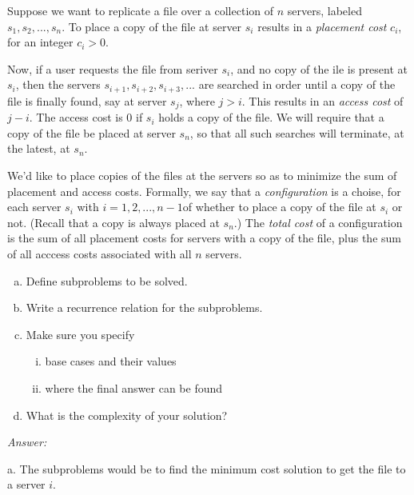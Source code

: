 \documentclass[12pt]{article}
\newenvironment{problem}[2][Problem]{\begin{trivlist}
\item[\hskip \labelsep {\bfseries #1}\hskip \labelsep {\bfseries #2.}]}{\end{trivlist}}
\begin{document}
\begin{problem}{2}
    Suppose we want to replicate a file over a collection of $n$ servers, labeled $s_1, s_2, ..., s_n$. To place a copy of the file at server $s_i$ results in a \textit{placement cost} $c_i$, for an integer $c_i>0$.
    
    Now, if a user requests the file from seriver $s_i$, and no copy of the ile is present at $s_i$, then the servers $s_{i+1}, s_{i+2}, s_{i+3}, ...$ are searched in order until a copy of the file is finally found, say at server $s_j$, where $j>i$. This results in an \textit{access cost} of $j-i$. The access cost is 0 if $s_i$ holds a copy of the file. We will require that a copy of the file be placed at server $s_n$, so that all such searches will terminate, at the latest, at $s_n$.

    We'd like to place copies of the files at the servers so as to minimize the sum of placement and access costs. Formally, we say that a \textit{configuration} is a choise, for each server $s_i$ with $i=1,2,...,n-1$of whether to place a copy of the file at $s_i$ or not. (Recall that a copy is always placed at $s_n$.) The \textit{total cost} of a configuration is the sum of all placement costs for servers with a copy of the file, plus the sum of all acccess costs associated with all $n$ servers.

    \begin{enumerate}[a.]
        \item Define subproblems to be solved.
        \item Write a recurrence relation for the subproblems.
        \item Make sure you specify
        \begin{enumerate}[i.]
            \item base cases and their values
            \item where the final answer can be found
        \end{enumerate}
        \item What is the complexity of your solution?
    \end{enumerate}
\end{problem}
\textit{Answer:}

a. The subproblems would be to find the minimum cost solution to get the file to a server $i$.
\end{document}
